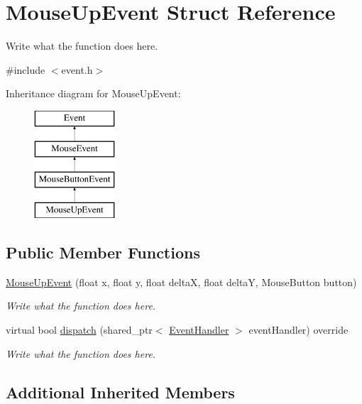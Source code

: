 \hypertarget{structMouseUpEvent}{\section{Mouse\+Up\+Event Struct Reference}
\label{structMouseUpEvent}
}


Write what the function does here.  




{\ttfamily \#include $<$event.\+h$>$}

Inheritance diagram for Mouse\+Up\+Event\+:\begin{figure}[H]
\begin{center}
\leavevmode
\includegraphics[height=4.000000cm]{structMouseUpEvent}
\end{center}
\end{figure}
\subsection*{Public Member Functions}
\begin{DoxyCompactItemize}
\item 
\hyperlink{structMouseUpEvent_ac1395cedfc2ab584976e41450cbdeab9}{Mouse\+Up\+Event} (float x, float y, float delta\+X, float delta\+Y, Mouse\+Button button)
\begin{DoxyCompactList}\small\item\em Write what the function does here. \end{DoxyCompactList}\item 
virtual bool \hyperlink{structMouseUpEvent_a013d0f9ff763239e909347e7624bfa04}{dispatch} (shared\+\_\+ptr$<$ \hyperlink{structEventHandler}{Event\+Handler} $>$ event\+Handler) override
\begin{DoxyCompactList}\small\item\em Write what the function does here. \end{DoxyCompactList}\end{DoxyCompactItemize}
\subsection*{Additional Inherited Members}


